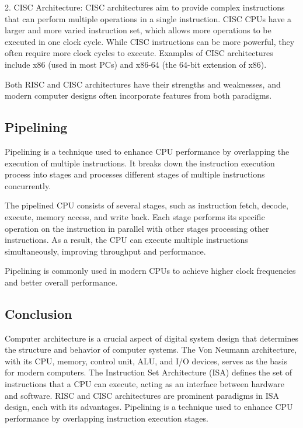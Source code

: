 \documentclass{article}
\begin{document}
2. CISC Architecture: CISC architectures aim to provide complex instructions that can perform multiple operations in a single instruction. CISC CPUs have a larger and more varied instruction set, which allows more operations to be executed in one clock cycle. While CISC instructions can be more powerful, they often require more clock cycles to execute. Examples of CISC architectures include x86 (used in most PCs) and x86-64 (the 64-bit extension of x86).

Both RISC and CISC architectures have their strengths and weaknesses, and modern computer designs often incorporate features from both paradigms.

\subsection{Pipelining}

Pipelining is a technique used to enhance CPU performance by overlapping the execution of multiple instructions. It breaks down the instruction execution process into stages and processes different stages of multiple instructions concurrently.

The pipelined CPU consists of several stages, such as instruction fetch, decode, execute, memory access, and write back. Each stage performs its specific operation on the instruction in parallel with other stages processing other instructions. As a result, the CPU can execute multiple instructions simultaneously, improving throughput and performance.

Pipelining is commonly used in modern CPUs to achieve higher clock frequencies and better overall performance.

\subsection{Conclusion}

Computer architecture is a crucial aspect of digital system design that determines the structure and behavior of computer systems. The Von Neumann architecture, with its CPU, memory, control unit, ALU, and I/O devices, serves as the basis for modern computers. The Instruction Set Architecture (ISA) defines the set of instructions that a CPU can execute, acting as an interface between hardware and software. RISC and CISC architectures are prominent paradigms in ISA design, each with its advantages. Pipelining is a technique used to enhance CPU performance by overlapping instruction execution stages.
\end{document}
